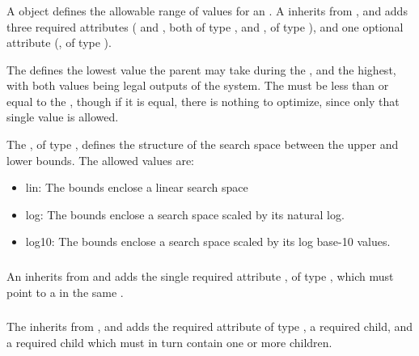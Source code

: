 \begin{blockChanged}
\subsubsection{}
\label{class:bounds}

A \Bounds object defines the allowable range of values for an \AdjustableParameter.  A \Bounds inherits from \SedBase, and adds three required attributes ( and , both of type , and , of type \ScaleType), and one optional attribute (, of type ).

The  defines the lowest value the parent \AdjustableParameter may take during the \ParameterEstimationTask, and  the highest, with both values being legal outputs of the system.  The  must be less than or equal to the , though if it is equal, there is nothing to optimize, since only that single value is allowed.

The , of type \ScaleType, defines the structure of the search space between the upper and lower bounds.  The allowed values are:

\begin{itemize}
\item lin:  The bounds enclose a linear search space
\item log:  The bounds enclose a search space scaled by its natural log.
\item log10:  The bounds enclose a search space scaled by its log base-10 values.
\end{itemize}


\subsubsection{}
\label{class:experimentRef}

An \ExperimentRef inherits from \SedBase and adds the single required attribute , of type \SIdRef, which must point to a \FitExperiment in the same \ParameterEstimationTask.  


\subsubsection{}
\label{class:fitExperiment}
\label{class:listOfFitMappings}

The \FitExperiment inherits from \SedBase, and adds the required attribute  of type \ExperimentType, a required \Algorithm child, and a required \ListOfFitMappings child which must in turn contain one or more \FitMapping children.


\end{blockChanged}
